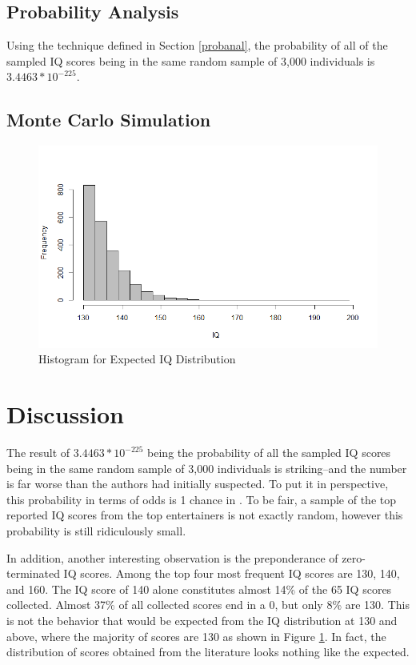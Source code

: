 \documentclass[12pt,letterpaper,titlepage,oneside]{article}
\begin{document}
\subsection{Probability Analysis}
Using the technique defined in Section \ref{probanal}, the probability of all of the sampled IQ scores being in the same random sample of 3,000 individuals is $3.4463 * 10^{-225}$.

\subsection{Monte Carlo Simulation}
\begin{figure}[h!]
\caption{Histogram for Expected IQ Distribution}
\label{iqhist}
\includegraphics[scale=.5]{expected-above-average}
\end{figure}

\section{Discussion}
The result of $3.4463 * 10^{-225}$ being the probability of all the sampled IQ scores being in the same random sample of 3,000 individuals is striking--and the number is far worse than the authors had initially suspected. To put it in perspective, this probability in terms of odds is 1 chance in . To be fair, a sample of the top reported IQ scores from the top entertainers is not exactly random, however this probability is still ridiculously small.

In addition, another interesting observation is the preponderance of zero-terminated IQ scores. Among the top four most frequent IQ scores are 130, 140, and 160. The IQ score of 140 alone constitutes almost 14\% of the 65 IQ scores collected. Almost 37\% of all collected scores end in a 0, but only 8\% are 130. This is not the behavior that would be expected from the IQ distribution at 130 and above, where the majority of scores are 130 as shown in Figure \ref{iqhist}. In fact, the distribution of scores obtained from the literature looks nothing like the expected.
\end{document}
